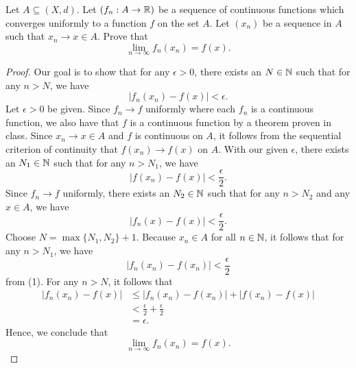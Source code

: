 \documentclass[a4paper]{article}
\begin{document}
\begin{problem}
    Let \( A \subseteq (X,d)  \). Let \( ({f}_{n}: A \to \mathbb{R} ) \) be a sequence of continuous functions which converges uniformly to a function \( f  \) on the set \( A  \). Let \( ({x}_{n}) \) be a sequence in \( A  \) such that \( {x}_{n} \to x \in A  \). Prove that 
    \[  \lim_{ n \to \infty  }  {f}_{n}({x}_{n}) = f(x). \]
\end{problem}
\begin{proof}
Our goal is to show that for any \( \epsilon > 0  \), there exists an \( N \in \mathbb{N} \) such that for any \( n > N  \), we have 
\[  | {f}_{n}({x}_{n}) - f(x) |  < \epsilon. \]
Let \( \epsilon > 0  \) be given. Since \( {f}_{n} \to f  \) uniformly where each \( {f}_{n} \) is a continuous function, we also have that \( f  \) is a continuous function by a theorem proven in class. Since \( {x}_{n} \to x \in A  \) and \( f  \) is continuous on \( A  \), it follows from the sequential criterion of continuity that \( f({x}_{n}) \to f(x) \) on \( A  \). With our given \( \epsilon  \), there exists an \( {N}_{1} \in \mathbb{N} \) such that for any \( n > {N}_{1} \), we have 
\[  | f({x}_{n}) - f(x) |  < \frac{ \epsilon }{ 2 }. \tag{1} \]
Since \( {f}_{n} \to f  \) uniformly, there exists an \( {N}_{2} \in \mathbb{N} \) such that for any \( n > {N}_{2} \) and any \( x \in A  \), we have
\[  | {f}_{n}(x) - f(x) | < \frac{ \epsilon }{ 2 }. \tag{2}  \]
Choose \( N = \max \{ {N}_{1} , {N}_{2} \} + 1  \). Because \( {x}_{n} \in A  \) for all \( n \in \mathbb{N}  \), it follows that for any \( n > {N}_{1}  \), we have 
\[  | {f}_{n}({x}_{n}) - f({x}_{n}) | < \frac{ \epsilon }{ 2 }   \]
from (1). For any \( n > N \), it follows that 
\begin{align*}
    | f_n({x}_{n}) - f(x) | &\leq | f_n({x}_{n}) - f({x}_{n}) | + | f({x}_{n}) - f(x) |    \\
                            &< \frac{ \epsilon }{ 2 }  + \frac{ \epsilon }{ 2 }  \\
                            &= \epsilon.
\end{align*}
Hence, we conclude that 
\[  \lim_{ n \to \infty  } {f}_{n}({x}_{n}) = f(x). \]
\end{proof}
\end{document}
